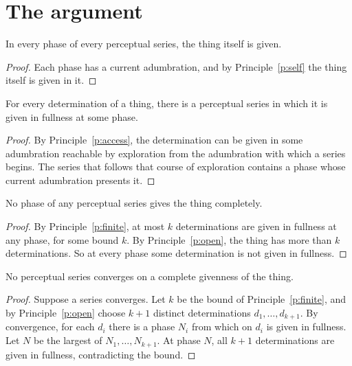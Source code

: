 \documentclass{situationist-preprint}
\begin{document}
\section{The argument}\label{s:argument}

\begin{lemma}\label{l:return}
In every phase of every perceptual series, the thing itself is given.
\end{lemma}

\begin{proof}
Each phase has a current adumbration, and by Principle~\ref{p:self} the thing itself is given in it.
\end{proof}

\begin{lemma}\label{l:each}
For every determination of a thing, there is a perceptual series in which it is given in fullness at some phase.
\end{lemma}

\begin{proof}
By Principle~\ref{p:access}, the determination can be given in some adumbration reachable by exploration from the adumbration with which a series begins. The series that follows that course of exploration contains a phase whose current adumbration presents it.
\end{proof}

\begin{lemma}\label{l:never}
No phase of any perceptual series gives the thing completely.
\end{lemma}

\begin{proof}
By Principle~\ref{p:finite}, at most $k$ determinations are given in fullness at any phase, for some bound $k$. By Principle~\ref{p:open}, the thing has more than $k$ determinations. So at every phase some determination is not given in fullness.
\end{proof}

\begin{theorem}\label{t:main}
No perceptual series converges on a complete givenness of the thing.
\end{theorem}

\begin{proof}
Suppose a series converges. Let $k$ be the bound of Principle~\ref{p:finite}, and by Principle~\ref{p:open} choose $k+1$ distinct determinations $d_1, \dots, d_{k+1}$. By convergence, for each $d_i$ there is a phase $N_i$ from which on $d_i$ is given in fullness. Let $N$ be the largest of $N_1, \dots, N_{k+1}$. At phase $N$, all $k+1$ determinations are given in fullness, contradicting the bound.
\end{proof}
\end{document}
